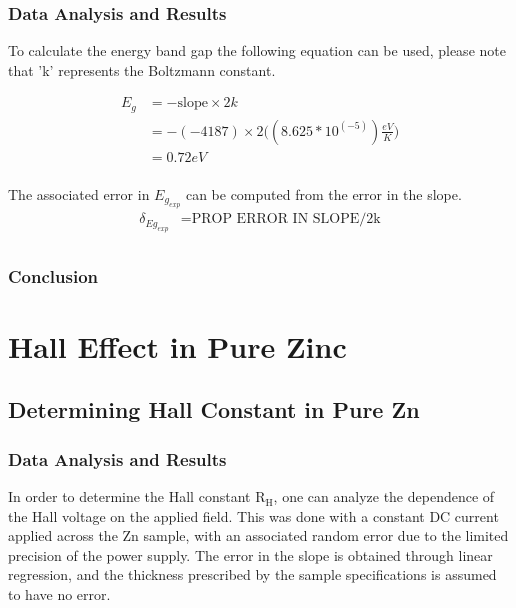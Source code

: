 \documentclass[a4paper]{article}
\begin{document}
\subsubsection{Data Analysis and Results}
\qq To calculate the energy band gap the following equation can be
used, please note that 'k' represents the Boltzmann constant.

\begin{align*}
E_g &= - \text{slope} \times 2k \\
    &= - (-4187) \times 2
       \Big(( 8.625 * 10^(-5)) \frac{eV}{K} \Big) \\
    &= 0.72 eV \\
\end{align*}



The associated error in $E_{g_{exp}}$ can be computed from the error in the slope.
\begin{align*}
\delta_{Eg_{exp}} &= \text{PROP ERROR IN SLOPE/2k} \\
\end{align*}


\subsubsection{Conclusion}

\section{Hall Effect in Pure Zinc}

\subsection{Determining Hall Constant in Pure Zn}

\subsubsection{Data Analysis and Results}
\qq In order to determine the Hall constant $\text{R}_\text{H}$, one can
analyze the dependence of the Hall voltage on the applied field. This
was done with a constant DC current applied across the Zn sample, with
an associated random error due to the limited precision of the power
supply. The error in the slope is obtained through linear regression,
and the thickness prescribed by the sample specifications is assumed
to have no error.
\end{document}

